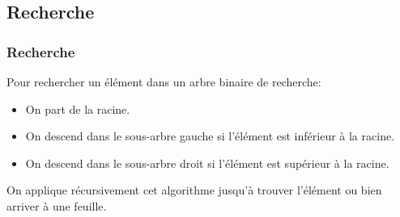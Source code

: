 \documentclass[svgnames,11pt]{beamer}
\begin{document}
\subsection{Recherche}
\begin{frame}
    \frametitle{Recherche}

    Pour rechercher un élément dans un arbre binaire de recherche:
    \begin{itemize}
        \item On part de la racine.
        \item On descend dans le sous-arbre gauche si l'élément est inférieur à la racine.
        \item On descend dans le sous-arbre droit si l'élément est supérieur à la racine. 
    \end{itemize}
On applique récursivement cet algorithme jusqu'à trouver l'élément ou bien arriver à une feuille. 

\end{frame}
\end{document}
